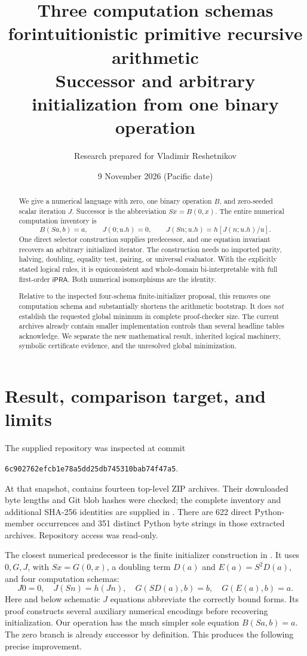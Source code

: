 \documentclass[11pt]{article}
\title{Three computation schemas for\newline intuitionistic primitive recursive arithmetic\\[4pt]\large Successor and arbitrary initialization from one binary operation}
\author{Research prepared for Vladimir Reshetnikov}
\date{9 November 2026 (Pacific date)}
\theoremstyle{definition}
\newcommand{\ipra}{\mathsf{iPRA}}
\newcommand{\file}[1]{\texttt{\small\detokenize{#1}}}
\begin{document}
\maketitle
\begin{abstract}
We give a numerical language with zero, one binary operation $B$, and
zero-seeded scalar iteration $J$. Successor is the abbreviation
$Sx=B(0,x)$. The entire numerical computation inventory is
\[
 B(Sa,b)=a,\qquad J(0;u.h)=0,\qquad
 J(Sn;u.h)=h[J(n;u.h)/u].
\]
One direct selector construction supplies predecessor, and one equation
invariant recovers an arbitrary initialized iterator. The construction
needs no imported parity, halving, doubling, equality test, pairing, or
universal evaluator. With the explicitly stated logical rules, it is
equiconsistent and whole-domain bi-interpretable with full first-order
$\ipra$. Both numerical isomorphisms are the identity.

Relative to the inspected four-schema finite-initializer proposal, this
removes one computation schema and substantially shortens the arithmetic
bootstrap. It does \emph{not} establish the requested global minimum in
complete proof-checker size. The current archives already contain smaller
implementation controls than several headline tables acknowledge. We
separate the new mathematical result, inherited logical machinery,
symbolic certificate evidence, and the unresolved global minimization.
\end{abstract}
\tableofcontents
\newpage

\section{Result, comparison target, and limits}
\label{sec:status}

The supplied repository was inspected at commit
\begin{center}
\texttt{6c902762efcb1e78a5dd25db745310bab74f47a5}.
\end{center}
At that snapshot, \file{docs/drafts} contains fourteen top-level ZIP
archives. Their downloaded byte lengths and Git blob hashes were checked;
the complete inventory and additional SHA-256 identities are supplied in
\file{evidence/source_snapshot.json}. There are 622 direct Python-member
occurrences and 351 distinct Python byte strings in those extracted
archives. Repository access was read-only.

The closest numerical predecessor is the finite initializer construction
in \cite{kernel}. It uses $0,G,J$, with $Sx=G(0,x)$, a doubling term
$D(a)$ and $E(a)=S^2D(a)$, and four computation schemas:
\[
 J0=0,\quad J(Sn)=h(Jn),\quad
 G(SD(a),b)=b,\quad G(E(a),b)=a.
\]
Here and below schematic $J$ equations abbreviate the correctly bound
forms. Its proof constructs several auxiliary numerical encodings before
recovering initialization. Our operation has the much simpler sole
equation $B(Sa,b)=a$. The zero branch is already successor by definition.
This produces the following precise improvement.
\end{document}
